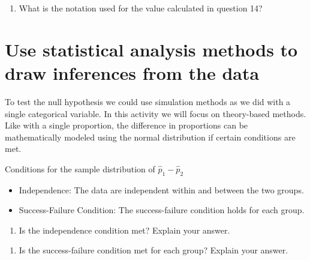\documentclass[
]{report}
\providecommand{\tightlist}{%
  \setlength{\itemsep}{0pt}\setlength{\parskip}{0pt}}
\begin{document}
\begin{enumerate}
\def\labelenumi{\arabic{enumi}.}
\setcounter{enumi}{14}
\tightlist
\item
  What is the notation used for the value calculated in question 14?
\end{enumerate}

\vspace{0.5in}

\hypertarget{use-statistical-analysis-methods-to-draw-inferences-from-the-data-1}{%
\section{Use statistical analysis methods to draw inferences from the data}\label{use-statistical-analysis-methods-to-draw-inferences-from-the-data-1}}

To test the null hypothesis we could use simulation methods as we did with a single categorical variable. In this activity we will focus on theory-based methods. Like with a single proportion, the difference in proportions can be mathematically modeled using the normal distribution if certain conditions are met.

Conditions for the sample distribution of \(\hat{p}_1-\hat{p}_2\)

\begin{itemize}
\item
  Independence: The data are independent within and between the two groups.
\item
  Success-Failure Condition: The success-failure condition holds for each group.
\end{itemize}

\vspace{.25in}

\begin{enumerate}
\def\labelenumi{\arabic{enumi}.}
\setcounter{enumi}{15}
\tightlist
\item
  Is the independence condition met? Explain your answer.
\end{enumerate}

\vspace{1in}

\begin{enumerate}
\def\labelenumi{\arabic{enumi}.}
\setcounter{enumi}{16}
\tightlist
\item
  Is the success-failure condition met for each group? Explain your answer.
\end{enumerate}

\vspace{1in}
\end{document}
